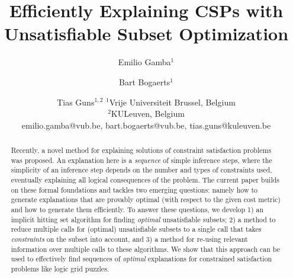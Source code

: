 \documentclass{article}
\title{Efficiently Explaining CSPs with Unsatisfiable Subset Optimization}
\author{
	Emilio Gamba$^1$
	\and
	Bart Bogaerts$^1$\and
	Tias Guns$^{1,2}$
	\affiliations
	$^1$Vrije Universiteit Brussel, Belgium\\
	$^2$KULeuven, Belgium\\
	\emails
	emilio.gamba@vub.be, bart.bogaerts@vub.be,
	tias.guns@kuleuven.be
}
\newcommand\maxsat{MaxSAT\xspace}
\begin{document}
 
\maketitle

\begin{abstract}
Recently, a novel method for explaining solutions of constraint satisfaction problems was proposed. 
% 
An explanation here is a \textit{sequence} of simple inference steps, where the simplicity of an inference step depends on the number and types of constraints used, eventually explaining all logical consequences of the problem. 
The current paper %
builds on these formal foundations and tackles two emerging questions: namely how to generate explanations that are provably optimal (with respect to the given cost metric) and how to generate them efficiently. 
To answer these questions, we develop 1) an implicit hitting set algorithm for finding \textit{optimal} unsatisfiable subsets; 2) a method to reduce multiple calls for (optimal) unsatisfiable subsets to a single call that takes \emph{constraints} on the subset into account, and 3) a method for re-using relevant information over multiple calls to these algorithms. 
We show that this approach can be used to effectively find sequences of \textit{optimal} explanations for constrained satisfaction problems like logic grid puzzles.
\end{abstract}
\end{document}
